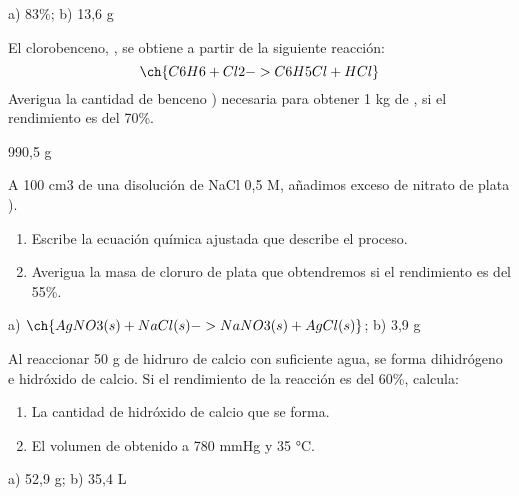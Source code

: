 \documentclass[
]{article}
\providecommand{\tightlist}{%
  \setlength{\itemsep}{0pt}\setlength{\parskip}{0pt}}
\begin{document}
\begin{solution}a) 83\%; b) 13,6 g\end{solution}

\begin{exercise}[tags=OXF15] El clorobenceno, , se obtiene a
partir de la siguiente reacción: \[\ch{C6H6 + Cl2 -> C6H5Cl + HCl}\]
Averigua la cantidad de benceno ) necesaria para obtener 1 kg
de , si el rendimiento es del 70\%.\end{exercise}

\begin{solution}990,5 g\end{solution}

\begin{exercise}[tags=OXF15] A 100 cm3 de una disolución de NaCl 0,5 M,
añadimos exceso de nitrato de plata ).

\begin{enumerate}
\def\labelenumi{\alph{enumi})}
\tightlist
\item
  Escribe la ecuación química ajustada que describe el proceso.
\item
  Averigua la masa de cloruro de plata que obtendremos si el rendimiento
  es del 55\%.
\end{enumerate}

\end{exercise}

\begin{solution}a) \(\ch{AgNO3(s) + NaCl(s) -> NaNO3(s) + AgCl(s)}\); b)
3,9 g\end{solution}

\begin{exercise}[tags=OXF15] Al reaccionar 50 g de hidruro de calcio con
suficiente agua, se forma dihidrógeno e hidróxido de calcio. Si el
rendimiento de la reacción es del 60\%, calcula:

\begin{enumerate}
\def\labelenumi{\alph{enumi})}
\tightlist
\item
  La cantidad de hidróxido de calcio que se forma.
\item
  El volumen de  obtenido a 780 mmHg y 35 °C.
\end{enumerate}

\end{exercise}

\begin{solution}a) 52,9 g; b) 35,4 L\end{solution}
\end{document}

